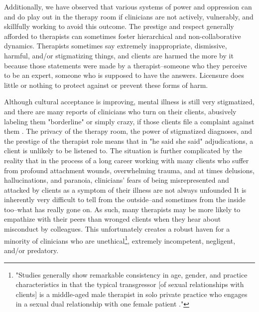\documentclass[12pt,letterpaper]{book}
\begin{document}
Additionally, we have observed that various systems of power and oppression can and do play out in the therapy room if clinicians are not actively, vulnerably, and skillfully working to avoid this outcome. The prestige and respect generally afforded to therapists can sometimes foster hierarchical and non-collaborative dynamics. Therapists sometimes say extremely inappropriate, dismissive, harmful, and/or stigmatizing things, and clients are harmed the more by it because those statements were made by a therapist–someone who they perceive to be an expert, someone who is supposed to have the answers. Licensure does little or nothing to protect against or prevent these forms of harm. 

Although cultural acceptance is improving, mental illness is still very stigmatized, and there are many reports of clinicians who turn on their clients, abusively labeling them "borderline" or simply crazy, if those clients file a complaint against them \cite{hook2018boundary}.
The privacy of the therapy room, the power of stigmatized diagnoses, and the prestige of the therapist role means that in "he said she said" adjudications, a client is unlikely to be listened to. The situation is further complicated by the reality that in the process of a long career working with many clients who suffer from profound attachment wounds, overwhelming trauma, and at times delusions, hallucinations, and paranoia, clinicians' fears of being misrepresented and attacked by clients as a symptom of their illness are not always unfounded \cite{gutheil1991patients,williams2000victimized} It is inherently very difficult to tell from the outside–and sometimes from the inside too–what has really gone on. As such, many therapists may be more likely to empathize with their peers \cite{hook2018boundary} than wronged clients when they hear about misconduct by colleagues. This unfortunately creates a robust haven for a minority of clinicians who are unethical\footnote{"Studies generally show remarkable consistency in age, gender, and practice characteristics in that the typical transgressor [of sexual relationships with clients] is a middle-aged male therapist in solo private practice who engages in a sexual dual relationship with one female patient \cite{sexViolations}."}, extremely incompetent, negligent, and/or predatory.
\end{document}
